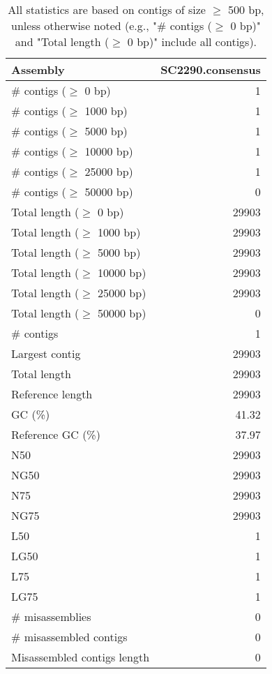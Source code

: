 \documentclass[12pt,a4paper]{article}
\begin{document}
\begin{table}[ht]
\begin{center}
\caption{All statistics are based on contigs of size $\geq$ 500 bp, unless otherwise noted (e.g., "\# contigs ($\geq$ 0 bp)" and "Total length ($\geq$ 0 bp)" include all contigs).}
\begin{tabular}{|l*{1}{|r}|}
\hline
Assembly & SC2290.consensus \\ \hline
\# contigs ($\geq$ 0 bp) & 1 \\ \hline
\# contigs ($\geq$ 1000 bp) & 1 \\ \hline
\# contigs ($\geq$ 5000 bp) & 1 \\ \hline
\# contigs ($\geq$ 10000 bp) & 1 \\ \hline
\# contigs ($\geq$ 25000 bp) & 1 \\ \hline
\# contigs ($\geq$ 50000 bp) & 0 \\ \hline
Total length ($\geq$ 0 bp) & 29903 \\ \hline
Total length ($\geq$ 1000 bp) & 29903 \\ \hline
Total length ($\geq$ 5000 bp) & 29903 \\ \hline
Total length ($\geq$ 10000 bp) & 29903 \\ \hline
Total length ($\geq$ 25000 bp) & 29903 \\ \hline
Total length ($\geq$ 50000 bp) & 0 \\ \hline
\# contigs & 1 \\ \hline
Largest contig & 29903 \\ \hline
Total length & 29903 \\ \hline
Reference length & 29903 \\ \hline
GC (\%) & 41.32 \\ \hline
Reference GC (\%) & 37.97 \\ \hline
N50 & 29903 \\ \hline
NG50 & 29903 \\ \hline
N75 & 29903 \\ \hline
NG75 & 29903 \\ \hline
L50 & 1 \\ \hline
LG50 & 1 \\ \hline
L75 & 1 \\ \hline
LG75 & 1 \\ \hline
\# misassemblies & 0 \\ \hline
\# misassembled contigs & 0 \\ \hline
Misassembled contigs length & 0 \\ \hline

\end{tabular}
\end{center}
\end{table}
\end{document}
